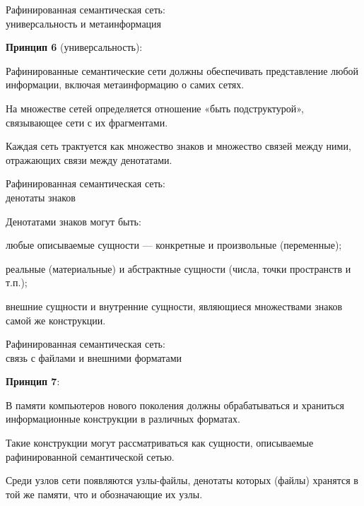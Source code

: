 \begin{frame}{Рафинированная семантическая сеть:\\универсальность и метаинформация}
	\topline
	\justifying
	
	\textbf{Принцип 6} (универсальность):
	\begin{textitemize}
		\item Рафинированные семантические сети должны обеспечивать представление любой информации, включая метаинформацию о самих сетях.
		\item На множестве сетей определяется отношение «быть подструктурой», связывающее сети с их фрагментами.
		\item Каждая сеть трактуется как множество знаков и множество связей между ними, отражающих связи между денотатами.
	\end{textitemize}
	
\end{frame}


\begin{frame}{Рафинированная семантическая сеть:\\денотаты знаков}
	\topline
	\justifying
	
	Денотатами знаков могут быть:
	\begin{textitemize}
		\item любые описываемые сущности --- конкретные и произвольные (переменные);
		\item реальные (материальные) и абстрактные сущности (числа, точки пространств и т.п.);
		\item внешние сущности и внутренние сущности, являющиеся множествами знаков самой же конструкции.
	\end{textitemize}
	
\end{frame}


\begin{frame}{Рафинированная семантическая сеть:\\связь с файлами и внешними форматами}
	\topline
	\justifying
	
	\textbf{Принцип 7}:
	\begin{textitemize}
		\item В памяти компьютеров нового поколения должны обрабатываться и храниться информационные конструкции в различных форматах.
		\item Такие конструкции могут рассматриваться как сущности, описываемые рафинированной семантической сетью.
		\item Среди узлов сети появляются узлы-файлы, денотаты которых (файлы) хранятся в той же памяти, что и обозначающие их узлы.
	\end{textitemize}
	
\end{frame}


